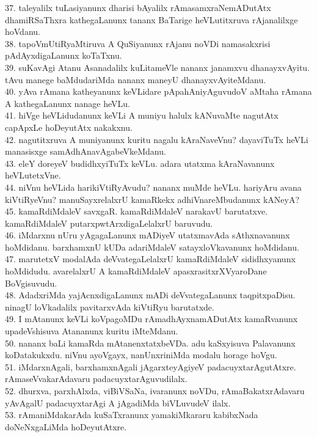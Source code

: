 \documentclass{article}
\begin{document}
37. taleyalilx tuLasiyanunx dharisi bAyalilx rAmasamxraNemADutAtx dhamiRSaThxra kathegaLanunx tananx BaTarige heVLutitxruva rAjanalilxge hoVdanu.\\
38. tapoVmUtiRyaMtiruva A QuSiyanunx rAjanu noVDi namasakxrisi pAdAyxdigaLanunx koTaTxnu.\\
39. suKavAgi Atanu Asanadalilx kuLitameVle nananx janamxvu dhanayxvAyitu. tAvu manege baMdudariMda nananx maneyU dhanayxvAyiteMdanu.\\
40. yAva rAmana katheyanunx keVLidare pApahAniyAguvudoV aMtaha rAmana A kathegaLanunx nanage heVLu.\\
41. hiVge heVLidudanunx keVLi A muniyu halulx kANuvaMte nagutAtx capApxLe hoDeyutAtx nakakxnu.\\
42. nagutitxruva A muniyanunx kuritu nagalu kAraNaveVnu? dayaviTuTx heVLi manasisxge samAdhAnavAgabeVkeMdanu.\\
43. eleY doreyeV budidhxyiTuTx keVLu. adara utatxma kAraNavanunx heVLutetxVne.\\
44. niVnu heVLida harikiVtiRyAvudu? nananx muMde heVLu. hariyAru avana kiVtiRyeVnu? manuSayxrelalxrU kamaRkekx adhiVnareMbudanunx kANeyA?\\
45. kamaRdiMdaleV savxgaR. kamaRdiMdaleV narakavU barutatxve. kamaRdiMdaleV putarxpwtArxdigaLelalxrU baruvudu.\\
46. iMdarxnu nUru yAgagaLanunx mADiyeV utatxmavAda sAthxnavanunx hoMdidanu. barxhamxnU kUDa adariMdaleV satayxloVkavanunx hoMdidanu.\\
47. marutetxV modalAda deVvategaLelalxrU kamaRdiMdaleV sididhxyanunx hoMdidudu. avarelalxrU A kamaRdiMdaleV apasxrasitxrXVyaroDane BoVgisuvudu.\\
48. AdadxriMda yajAcnxdigaLanunx mADi deVvategaLanunx taqpitxpaDisu. ninagU loVkadalilx pavitarxvAda kiVtiRyu barutatxde.\\
49. I mAtanunx keVLi koVpagoMDu rAmadhAyxnamADutAtx kamaRvanunx upadeVshisuva Atananunx kuritu iMteMdanu.\\
50. nananx baLi kamaRda mAtanenxtatxbeVDa. adu kaSxyisuva Palavanunx koDatakukxdu. niVnu ayoVgayx, nanUnxriniMda modalu horage hoVgu.\\
51. iMdarxnAgali, barxhamxnAgali jAgarxteyAgiyeV padacuyxtarAgutAtxre. rAmaseVvakarAdavaru padacuyxtarAguvudilalx.\\
52. dhurxva, parxhAlxda, viBiVSaNa, ivaranunx noVDu, rAmaBakatxrAdavaru yAvAgalU padacuyxtarAgi A jAgadiMda biVLuvudeV ilalx.\\
53. rAmaniMdakarAda kuSaTxranunx yamakiMkararu kabibxNada doNeNxgaLiMda hoDeyutAtxre.\\
\end{document}
